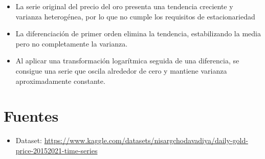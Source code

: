 \documentclass[
]{book}
\providecommand{\tightlist}{%
  \setlength{\itemsep}{0pt}\setlength{\parskip}{0pt}}
\begin{document}
\begin{itemize}
\tightlist
\item
  La serie original del precio del oro presenta una tendencia creciente y varianza heterogénea, por lo que no cumple los requisitos de estacionariedad
\item
  La diferenciación de primer orden elimina la tendencia, estabilizando la media pero no completamente la varianza.
\item
  Al aplicar una transformación logarítmica seguida de una diferencia, se consigue una serie que oscila alrededor de cero y mantiene varianza aproximadamente constante.
\end{itemize}

\chapter{Fuentes}\label{fuentes}

\begin{itemize}
\tightlist
\item
  Dataset: \url{https://www.kaggle.com/datasets/nisargchodavadiya/daily-gold-price-20152021-time-series}
\end{itemize}

  
\end{document}

